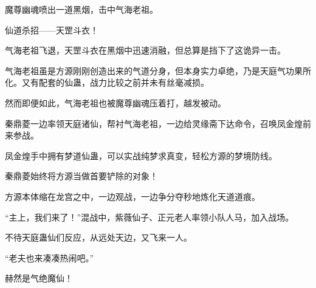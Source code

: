\begin{this_body}
魔尊幽魂喷出一道黑烟，击中气海老祖。

仙道杀招——天罡斗衣！

气海老祖飞退，天罡斗衣在黑烟中迅速消融，但总算是挡下了这诡异一击。

气海老祖虽是方源刚刚创造出来的气道分身，但本身实力卓绝，乃是天庭气功果所化。又有配套的仙蛊，战力比较之前并未有丝毫减损。

然而即便如此，气海老祖也被魔尊幽魂压着打，越发被动。

秦鼎菱一边率领天庭诸仙，帮衬气海老祖，一边给灵缘斋下达命令，召唤凤金煌前来参战。

凤金煌手中拥有梦道仙蛊，可以实战纯梦求真变，轻松方源的梦境防线。

秦鼎菱始终将方源当做首要铲除的对象！

方源本体缩在龙宫之中，一边观战，一边争分夺秒地炼化天道道痕。

“主上，我们来了！”混战中，紫薇仙子、正元老人率领小队人马，加入战场。

不待天庭蛊仙们反应，从远处天边，又飞来一人。

“老夫也来凑凑热闹吧。”

赫然是气绝魔仙！

\end{this_body}

